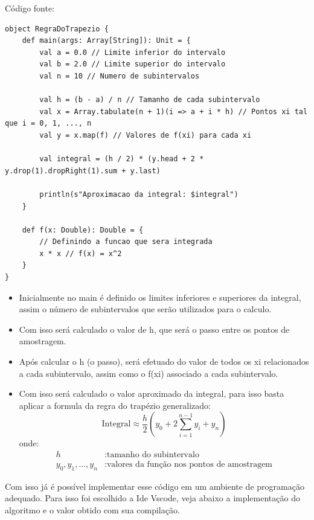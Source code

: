     Código fonte:
    
    \begin{lstlisting}[breaklines]
object RegraDoTrapezio {
	def main(args: Array[String]): Unit = {
		val a = 0.0 // Limite inferior do intervalo
		val b = 2.0 // Limite superior do intervalo
		val n = 10 // Numero de subintervalos
		
		val h = (b - a) / n // Tamanho de cada subintervalo
		val x = Array.tabulate(n + 1)(i => a + i * h) // Pontos xi tal que i = 0, 1, ..., n
		val y = x.map(f) // Valores de f(xi) para cada xi
		
		val integral = (h / 2) * (y.head + 2 * y.drop(1).dropRight(1).sum + y.last)
		
		println(s"Aproximacao da integral: $integral")
	}
	
	def f(x: Double): Double = {
		// Definindo a funcao que sera integrada
		x * x // f(x) = x^2
	}
}
    \end{lstlisting} 

	\begin{itemize}
		\item Inicialmente no main é definido os limites inferiores e superiores da integral, assim o número de subintervalos que serão utilizados para o calculo.
		
		\item Com isso será calculado o valor de h, que será o passo entre os pontos de amostragem.
		
		\item Após calcular o h (o passo), será efetuado do valor de todos os xi relacionados a cada subintervalo, assim como o f(xi) associado a cada subintervalo.
		
		\item Com isso será calculado o valor aproximado da integral, para isso basta aplicar a formula da regra do trapézio generalizado:
		\[
		\text{{Integral}} \approx \frac{h}{2} \left( y_0 + 2 \sum_{i=1}^{n-1} y_i + y_n \right)
		\]
		onde:
		\begin{align*}
			h & : \text{{tamanho do subintervalo}} \\
			y_0, y_1, ..., y_n & : \text{{valores da função nos pontos de amostragem}}
		\end{align*}
	\end{itemize}
    
    Com isso já é possível implementar esse código em um ambiente de programação adequado. Para isso foi escolhido a Ide Vscode, veja abaixo a implementação do algoritmo e o valor obtido com sua compilação.
    

